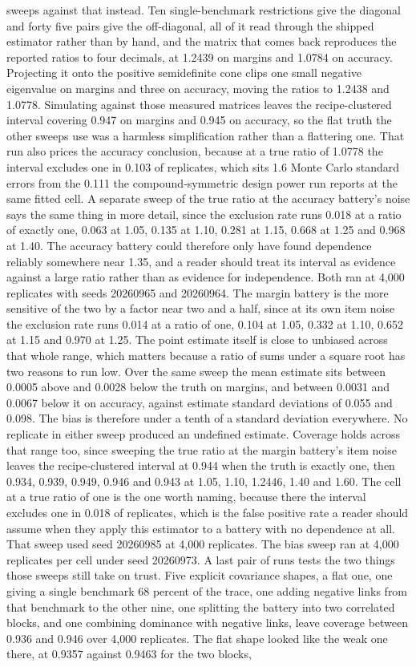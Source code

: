 sweeps against that instead. Ten single-benchmark restrictions give the diagonal and forty five pairs give the off-diagonal, all of it read through the shipped estimator rather than by hand, and the matrix that comes back reproduces the reported ratios to four decimals, at 1.2439 on margins and 1.0784 on accuracy. Projecting it onto the positive semidefinite cone clips one small negative eigenvalue on margins and three on accuracy, moving the ratios to 1.2438 and 1.0778. Simulating against those measured matrices leaves the recipe-clustered interval covering 0.947 on margins and 0.945 on accuracy, so the flat truth the other sweeps use was a harmless simplification rather than a flattering one. That run also prices the accuracy conclusion, because at a true ratio of 1.0778 the interval excludes one in 0.103 of replicates, which sits 1.6 Monte Carlo standard errors from the 0.111 the compound-symmetric design power run reports at the same fitted cell. A separate sweep of the true ratio at the accuracy battery's noise says the same thing in more detail, since the exclusion rate runs 0.018 at a ratio of exactly one, 0.063 at 1.05, 0.135 at 1.10, 0.281 at 1.15, 0.668 at 1.25 and 0.968 at 1.40. The accuracy battery could therefore only have found dependence reliably somewhere near 1.35, and a reader should treat its interval as evidence against a large ratio rather than as evidence for independence. Both ran at 4,000 replicates with seeds 20260965 and 20260964. The margin battery is the more sensitive of the two by a factor near two and a half, since at its own item noise the exclusion rate runs 0.014 at a ratio of one, 0.104 at 1.05, 0.332 at 1.10, 0.652 at 1.15 and 0.970 at 1.25. The point estimate itself is close to unbiased across that whole range, which matters because a ratio of sums under a square root has two reasons to run low. Over the same sweep the mean estimate sits between 0.0005 above and 0.0028 below the truth on margins, and between 0.0031 and 0.0067 below it on accuracy, against estimate standard deviations of 0.055 and 0.098. The bias is therefore under a tenth of a standard deviation everywhere. No replicate in either sweep produced an undefined estimate. Coverage holds across that range too, since sweeping the true ratio at the margin battery's item noise leaves the recipe-clustered interval at 0.944 when the truth is exactly one, then 0.934, 0.939, 0.949, 0.946 and 0.943 at 1.05, 1.10, 1.2446, 1.40 and 1.60. The cell at a true ratio of one is the one worth naming, because there the interval excludes one in 0.018 of replicates, which is the false positive rate a reader should assume when they apply this estimator to a battery with no dependence at all. That sweep used seed 20260985 at 4,000 replicates. The bias sweep ran at 4,000 replicates per cell under seed 20260973. A last pair of runs tests the two things those sweeps still take on trust. Five explicit covariance shapes, a flat one, one giving a single benchmark 68 percent of the trace, one adding negative links from that benchmark to the other nine, one splitting the battery into two correlated blocks, and one combining dominance with negative links, leave coverage between 0.936 and 0.946 over 4,000 replicates. The flat shape looked like the weak one there, at 0.9357 against 0.9463 for the two blocks, 